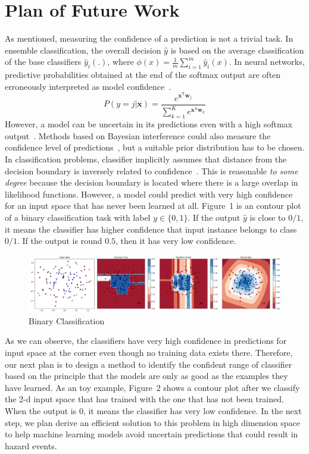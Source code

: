 \documentclass[11pt,onecolumn]{IEEEtran}
\begin{document}
\section{Plan of Future Work}
As mentioned, measuring the confidence of a prediction is not a trivial task. In ensemble classification,   the overall decision $\hat y$ is based on the average classification of the base classifiers $\hat y_i(.)$, where  $\phi( x)=\frac{1}{m}\sum_{i=1}^m \hat y_i( x)$. In neural networks, predictive probabilities obtained at the end of the softmax output are often erroneously interpreted as model confidence~\cite{nntogp}. 
\[
 P(y=j|\mathbf {x})=\frac { e^{\mathbf {x}^{\mathsf T} \mathbf w_j}}{
 \sum _{k=1}^{K}   e^{\mathbf x ^{\mathsf T}\mathbf w_k}}
\]
However, a model can be uncertain in its predictions even with a high softmax output~\cite{nntogp}.  Methods based on Bayesian interference could also measure the confidence level of predictions~\cite{bnn12}, but a suitable prior distribution has to be chosen.  In classification problems, classifier  implicitly assumes  that distance from the decision boundary is inversely related to confidence~\cite{errorbound}. This is reasonable \emph{to some degree} because the decision boundary is located where there is a large overlap in likelihood functions. However, a model could   predict with very high confidence for an input space that has never been learned at all.  Figure~1 is an contour plot of a binary classification task with label $y\in\{0,1\}$.  If the output $\hat y$ is  close to $0/1$,  it means the classifier has higher confidence that input instance belongs to class $0/1$. If the output is round $0.5$, then it has very low confidence.
\begin{figure}[h!]
  \label{fig:1}
  \caption{Binary Classification}
  \includegraphics[width=1\linewidth]{image/C1.png}
\end{figure}
As we can observe, the classifiers have very high confidence in predictions  for input space at the corner even though no training data exists there. Therefore, our next plan is to design a method to identify the confident range of classifier based  on the principle that the models are only as good as the examples they have learned. As an toy example,  Figure~2 shows a contour plot after we classify the 2-d input space that has trained with the one that has not been trained. When the output is 0, it means the classifier has very low confidence.  In the next step, we plan derive an efficient solution to this problem  in high dimension space to help machine learning models avoid uncertain predictions that could result in hazard events.
\end{document}
